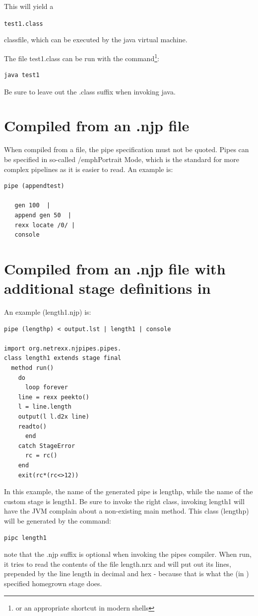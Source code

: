 This will yield a \begin{alltt}test1.class\end{alltt} classfile, which
can be executed by the java virtual machine.

The file test1.class can be run with the command\footnote{or an
  appropriate shortcut in modern shells}:
\begin{verbatim}
java test1
\end{verbatim}
Be sure to leave out the .class suffix when invoking java.
\section{Compiled from an .njp file}
When compiled from a file, the pipe specification must not be quoted. Pipes can be specified in so-called /emph{Portrait Mode}, which is the standard for more complex pipelines as it is easier to read.
An example is:
\begin{lstlisting}
pipe (appendtest)
 
   gen 100  |
   append gen 50  |
   rexx locate /0/ |
   console
\end{lstlisting}

\section{Compiled from an .njp file with additional stage definitions in \nr{}}
An example (length1.njp) is:
\begin{lstlisting}
pipe (lengthp) < output.lst | length1 | console

import org.netrexx.njpipes.pipes.
class length1 extends stage final
  method run()
    do
      loop forever
    line = rexx peekto()
    l = line.length
    output(l l.d2x line)
    readto()
      end
    catch StageError
      rc = rc()
    end
    exit(rc*(rc<>12))
\end{lstlisting}
In this example, the name of the generated pipe is lengthp, while the name of the custom stage is length1. Be sure to invoke the right class, invoking length1 will have the JVM complain about a non-existing main method.
This class (lengthp) will be generated by the command:
\begin{verbatim}
pipc length1
\end{verbatim}
note that the .njp suffix is optional when invoking the pipes
compiler. When run, it tries to read the contents of the file
length.nrx and will put out its lines, prepended by the line length in
decimal and hex - because that is what the (in \nr{}) specified
homegrown stage does.





